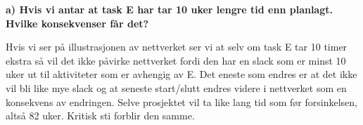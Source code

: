 		{\bf a) Hvis vi antar at task E har tar 10 uker lengre tid enn planlagt. Hvilke konsekvenser får det?}

		Hvis vi ser på illustrasjonen av nettverket ser vi at selv om task E tar 10 timer ekstra
		så vil det ikke påvirke nettverket fordi den har en slack som er minst 10 uker ut til 
		aktiviteter som er avhengig av E. Det eneste som endres er at det ikke vil bli like mye slack og at 
		seneste start/slutt endres videre i nettverket som en konsekvens av endringen. Selve prosjektet
		vil ta like lang tid som før forsinkelsen, altså 82 uker. Kritisk sti forblir den samme. 

